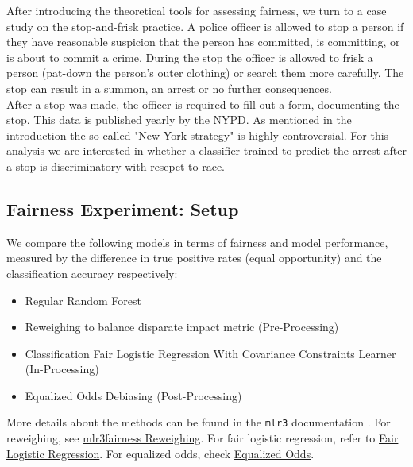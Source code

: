 After introducing the theoretical tools for assessing fairness, we turn to a case study on the stop-and-frisk practice.
A police officer is allowed to stop a person if they have reasonable suspicion that the person has committed, is committing, or is about to commit a crime.
During the stop the officer is allowed to frisk a person (pat-down the person's outer clothing) or search them more carefully.
The stop can result in a summon, an arrest or no further consequences.\\
After a stop was made, the officer is required to fill out a form, documenting the stop. This data is published yearly by the NYPD.
As mentioned in the introduction the so-called "New York strategy" \cite{gelman2007} is highly controversial. For this analysis we are interested in whether a classifier trained to predict the arrest after a stop is discriminatory with resepct to race.


\subsection{Fairness Experiment: Setup}
We compare the following models in terms of fairness and model performance, measured by the difference in true positive rates (equal opportunity)  and the classification accuracy respectively:
\begin{itemize}
    \item Regular Random Forest
    \item Reweighing to balance disparate impact metric (Pre-Processing)
    \item Classification Fair Logistic Regression With Covariance Constraints Learner (In-Processing)
    \item Equalized Odds Debiasing (Post-Processing)
\end{itemize}
More details about the methods can be found in the \texttt{mlr3} documentation \cite{mlr3_book}.  
For reweighing, see \href{https://mlr3fairness.mlr-org.com/reference/mlr_pipeops_reweighing.html}{mlr3fairness Reweighing}.  
For fair logistic regression, refer to \href{https://rdrr.io/cran/mlr3fairness/man/mlr_learners_classif.fairzlrm.html}{Fair Logistic Regression}.  
For equalized odds, check \href{https://mlr3fairness.mlr-org.com/reference/mlr_pipeops_equalized_odds.html}{Equalized Odds}.  

